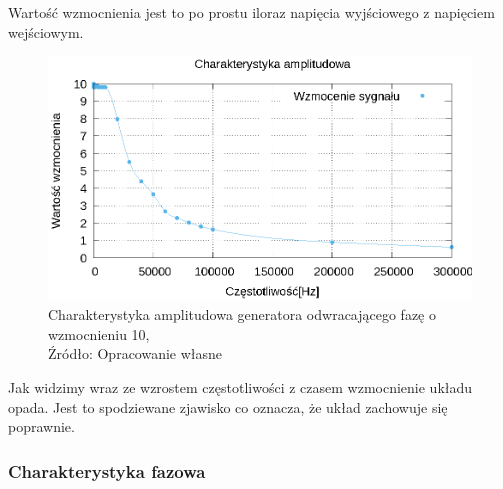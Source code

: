 \documentclass{article}
\begin{document}
      Wartość wzmocnienia jest to po prostu iloraz napięcia wyjściowego z napięciem wejściowym.

      \begin{figure}[!ht]
        \centering
        \includegraphics[scale=1]{grafiki/amp_plot.eps}
        \caption{Charakterystyka amplitudowa generatora odwracającego fazę o wzmocnieniu 10,
        \\Źródło: Opracowanie własne}
      \end{figure}

      Jak widzimy wraz ze wzrostem częstotliwości z czasem wzmocnienie układu opada. Jest to spodziewane zjawisko co oznacza, że układ zachowuje się poprawnie.

      \subsubsection{Charakterystyka fazowa}
\end{document}

